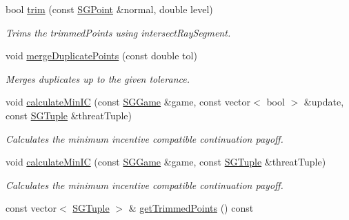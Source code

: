 \begin{DoxyCompactItemize}
bool \hyperlink{classSGAction__MaxMinMax_a15466a06d5b9bdce97eaa20f9fa94371}{trim} (const \hyperlink{classSGPoint}{S\+G\+Point} \&normal, double level)
\begin{DoxyCompactList}\small\item\em Trims the trimmed\+Points using intersect\+Ray\+Segment. \end{DoxyCompactList}\item 
\mbox{\label{classSGAction__MaxMinMax_a436f348d7f24cd28a029f25e94aadf8a}} 
void \hyperlink{classSGAction__MaxMinMax_a436f348d7f24cd28a029f25e94aadf8a}{merge\+Duplicate\+Points} (const double tol)
\begin{DoxyCompactList}\small\item\em Merges duplicates up to the given tolerance. \end{DoxyCompactList}\item 
\mbox{\label{classSGAction__MaxMinMax_a38b72633733d68122a63ee366eb11e64}} 
void \hyperlink{classSGAction__MaxMinMax_a38b72633733d68122a63ee366eb11e64}{calculate\+Min\+IC} (const \hyperlink{classSGGame}{S\+G\+Game} \&game, const vector$<$ bool $>$ \&update, const \hyperlink{classSGTuple}{S\+G\+Tuple} \&threat\+Tuple)
\begin{DoxyCompactList}\small\item\em Calculates the minimum incentive compatible continuation payoff. \end{DoxyCompactList}\item 
\mbox{\label{classSGAction__MaxMinMax_a446205895c561c6f54388b63a4a5e39c}} 
void \hyperlink{classSGAction__MaxMinMax_a446205895c561c6f54388b63a4a5e39c}{calculate\+Min\+IC} (const \hyperlink{classSGGame}{S\+G\+Game} \&game, const \hyperlink{classSGTuple}{S\+G\+Tuple} \&threat\+Tuple)
\begin{DoxyCompactList}\small\item\em Calculates the minimum incentive compatible continuation payoff. \end{DoxyCompactList}\item 
\mbox{\label{classSGAction__MaxMinMax_ae64c1a8a37df28b0df8ca9b7ea1a51b9}} 
const vector$<$ \hyperlink{classSGTuple}{S\+G\+Tuple} $>$ \& \hyperlink{classSGAction__MaxMinMax_ae64c1a8a37df28b0df8ca9b7ea1a51b9}{get\+Trimmed\+Points} () const

\end{DoxyCompactItemize}
